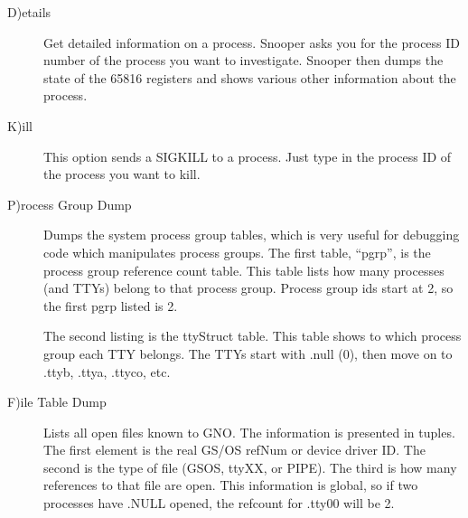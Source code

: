 \documentclass{report}
\begin{document}
\begin{description}
\item[D)etails]

Get detailed information on a process.
Snooper asks you for the process ID number of the process you
want to investigate. Snooper then dumps the state of the 65816
registers and shows various other information about the process.

\item[K)ill]

This option sends a SIGKILL to a process. Just type in the process ID
of the process you want to kill.

\item[P)rocess Group Dump]

Dumps the system process group tables,
which is very useful for debugging code which manipulates process
groups. The first table, ``pgrp'', is the process group reference
count table. This table lists how many processes (and TTYs)
belong to that process group. 
Process group ids start at 2, so the first pgrp listed is 2.

The second listing is the ttyStruct table.
This table shows to which process group each TTY belongs. The TTYs start
with .null (0), then move on to .ttyb, .ttya, .ttyco, etc.

\item[F)ile Table Dump]

Lists all open files known to GNO.
The information is presented in tuples. The first element is the
real GS/OS refNum or device driver ID. The second is the type of
file (GSOS, ttyXX, or PIPE). The third is how many references to
that file are open. This information is global, so if two
processes have .NULL opened, the refcount for .tty00 will be 2.

\end{description}



\parindent=20pt
\end{document}
